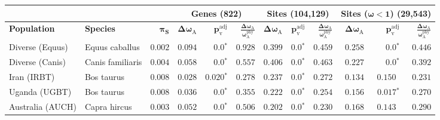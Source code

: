 \documentclass[11pt]{article}
\begin{document}
    \begin{table*}[tb]
        \centering
        \begin{tabular}{||l|l|r||r|r|r||r|r|r||r|r|r||}
            \toprule
            \multicolumn{3}{||c||}{} &
            \multicolumn{3}{c||}{\textbf{Genes (822)}} &
            \multicolumn{3}{c||}{\textbf{Sites (104,129)}} &
            \multicolumn{3}{c||}{\textbf{Sites ($\bm{\omega < 1}$) (29,543)}}
            \\ \hline
            \textbf{Population} &
            \textbf{Species} &
            $\bm{\pi_{\textrm{S}}}$ &
            $\bm{\Delta \omega_{\mathrm{A}}}$ &
            $\bm{p_{\mathrm{v}}^{\mathrm{adj}}}$    &
            $\bm{\frac{\Delta\omega_{\mathrm{A}}}{\omega_{\mathrm{A}}^{\mathrm{phy}}}}$ &
            $\bm{\Delta \omega_{\mathrm{A}}}$ &
            $\bm{p_{\mathrm{v}}^{\mathrm{adj}}}$          &
            $\bm{\frac{\Delta\omega_{\mathrm{A}}}{\omega_{\mathrm{A}}^{\mathrm{phy}}}}$ &
            $\bm{\Delta \omega_{\mathrm{A}}}$ &
            $\bm{p_{\mathrm{v}}^{\mathrm{adj}}}$ &
            $\bm{\frac{\Delta\omega_{\mathrm{A}}}{\omega_{\mathrm{A}}^{\mathrm{phy}}}}$
            \\                \midrule
            Diverse (Equus)                                     & Equus caballus      & $ 0.002$ & $ 0.094$ & $\bm{0.0{^*}}$    & $ 0.928$ & $ 0.399$ & $\bm{0.0{^*}}$ & $ 0.459$ & $ 0.258$ & $\bm{0.0{^*}}$ & $ 0.446$ \\
            \rowcolor{LIGHTGREY} Diverse (Canis)                & Canis familiaris    & $ 0.004$ & $ 0.058$ & $\bm{0.0{^*}}$                  & $ 0.557$                                                                     & $ 0.406$ & $\bm{0.0{^*}}$ & $ 0.463$ & $ 0.227$ & $\bm{0.0{^*}}$ & $ 0.392$ \\
            Iran (IRBT)                                         & Bos taurus          & $ 0.008$ & $ 0.028$ & $\bm{ 0.020{^*}}$ & $ 0.278$ & $ 0.237$ & $\bm{0.0{^*}}$ & $ 0.272$ & $ 0.134$ & $ 0.150~~$ & $ 0.231$ \\
            Uganda (UGBT)                                       & Bos taurus          & $ 0.008$ & $ 0.036$ & $\bm{0.0{^*}}$    & $ 0.355$ & $ 0.222$ & $\bm{0.0{^*}}$ & $ 0.254$ & $ 0.156$ & $\bm{ 0.017{^*}}$ & $ 0.270$ \\
            \rowcolor{LIGHTGREY} Australia (AUCH)               & Capra hircus        & $ 0.003$ & $ 0.052$ & $\bm{0.0{^*}}$                  & $ 0.506$                                                                     & $ 0.202$ & $\bm{0.0{^*}}$ & $ 0.230$ & $ 0.168$ & $ 0.143~~$ & $ 0.290$ \\

\end{tabular}
\end{table*}
\end{document}
